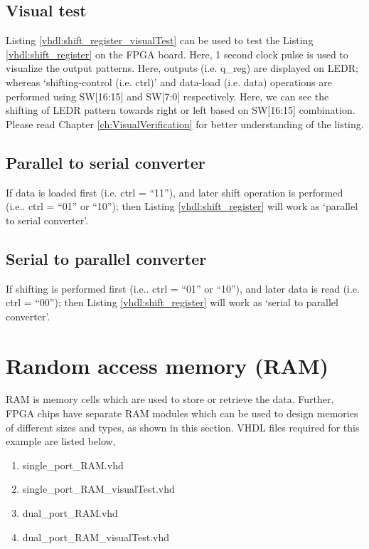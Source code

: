 \subsection{Visual test}

Listing \ref{vhdl:shift_register_visualTest} can be used to test the Listing \ref{vhdl:shift_register} on the FPGA board. Here, 1 second clock pulse is used to visualize the output patterns. Here, outputs (i.e. q\_reg) are displayed on LEDR; whereas `shifting-control (i.e. ctrl)' and data-load (i.e. data) operations are performed using SW[16:15] and SW[7:0] respectively. Here, we can see the shifting of LEDR pattern towards right or left based on SW[16:15] combination. Please read Chapter \ref{ch:VisualVerification} for better understanding of the listing.



\subsection{Parallel to serial converter}
If data is loaded first (i.e. ctrl = ``11''), and later shift operation is performed (i.e.. ctrl = ``01'' or ``10''); then Listing \ref{vhdl:shift_register} will work as `parallel to serial converter'. 

\subsection{Serial to parallel converter}
If shifting is performed first (i.e.. ctrl = ``01'' or ``10''), and later data is read (i.e. ctrl = ``00''); then Listing \ref{vhdl:shift_register} will work as `serial to parallel converter'.

\section{Random access memory (RAM)}
RAM is memory cells which are used to store or retrieve the data. Further, FPGA chips have separate RAM modules which can be used to design memories of different sizes and types, as shown in this section. VHDL files required for this example are listed below, 
\begin{enumerate}
	\item single\_port\_RAM.vhd
	\item single\_port\_RAM\_visualTest.vhd
	\item dual\_port\_RAM.vhd
	\item dual\_port\_RAM\_visualTest.vhd
\end{enumerate}

